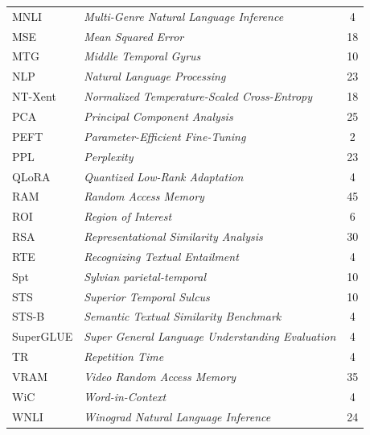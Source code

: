 \begin{longtable}{@{} l >{\raggedright\arraybackslash}p{7.5cm} c @{}}
MNLI & \textit{Multi-Genre Natural Language Inference} & 4 \\
MSE & \textit{Mean Squared Error} & 18 \\
MTG & \textit{Middle Temporal Gyrus} & 10 \\
NLP & \textit{Natural Language Processing} & 23 \\
NT-Xent & \textit{Normalized Temperature-Scaled Cross-Entropy} & 18 \\
PCA & \textit{Principal Component Analysis} & 25 \\
PEFT & \textit{Parameter-Efficient Fine-Tuning} & 2 \\
PPL & \textit{Perplexity} & 23 \\
QLoRA & \textit{Quantized Low-Rank Adaptation} & 4 \\
RAM & \textit{Random Access Memory} & 45 \\
ROI & \textit{Region of Interest} & 6 \\
RSA & \textit{Representational Similarity Analysis} & 30 \\
RTE & \textit{Recognizing Textual Entailment} & 4 \\
Spt & \textit{Sylvian parietal-temporal} & 10 \\
STS & \textit{Superior Temporal Sulcus} & 10 \\
STS-B & \textit{Semantic Textual Similarity Benchmark} & 4 \\
SuperGLUE & \textit{Super General Language Understanding Evaluation} & 4 \\
TR & \textit{Repetition Time} & 4 \\
VRAM & \textit{Video Random Access Memory} & 35 \\
WiC & \textit{Word-in-Context} & 4 \\
WNLI & \textit{Winograd Natural Language Inference} & 24 \\



\end{longtable}

